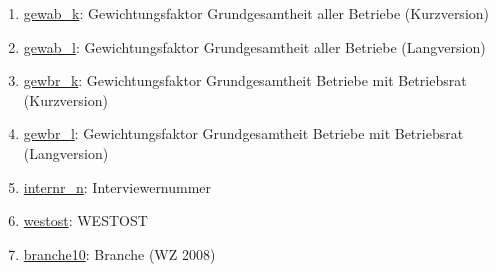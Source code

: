 \begin{enumerate}

\item \hyperref[var:suf:gewab:k]{gewab\_k}: Gewichtungsfaktor Grundgesamtheit aller Betriebe (Kurzversion)
\item \hyperref[var:suf:gewab:l]{gewab\_l}: Gewichtungsfaktor Grundgesamtheit aller Betriebe (Langversion)
\item \hyperref[var:suf:gewbr:k]{gewbr\_k}: Gewichtungsfaktor Grundgesamtheit Betriebe mit Betriebsrat (Kurzversion)
\item \hyperref[var:suf:gewbr:l]{gewbr\_l}: Gewichtungsfaktor Grundgesamtheit Betriebe mit Betriebsrat (Langversion)
\item \hyperref[var:suf:internr:n]{internr\_n}: Interviewernummer
\item \hyperref[var:suf:westost]{westost}: WESTOST
\item \hyperref[var:suf:branche10]{branche10}: Branche (WZ 2008)

\end{enumerate}
